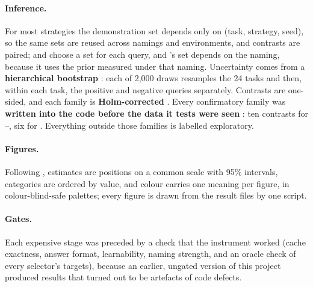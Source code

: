 \paragraph{Inference.}
For most strategies the demonstration set depends only on (task, strategy, seed), so the same sets are reused across namings and environments, and contrasts are paired;  and \sata choose a set for each query, and 's set depends on the naming, because it uses the prior measured under that naming.
Uncertainty comes from a \textbf{hierarchical bootstrap} \citep{efron1993introduction,davison1997bootstrap}: each of 2,000 draws resamples the 24 tasks and then, within each task, the positive and negative queries separately.
Contrasts are one-sided, and each family is \textbf{Holm-corrected} \citep{holm1979simple}.
Every confirmatory family was \textbf{written into the code before the data it tests were seen} \citep{nosek2018preregistration}: ten contrasts for --, six for \sata.
Everything outside those families is labelled exploratory.

\paragraph{Figures.}
Following \citet{healy2019data}, estimates are positions on a common scale with 95\% intervals, categories are ordered by value, and colour carries one meaning per figure, in colour-blind-safe palettes; every figure is drawn from the result files by one script.

\paragraph{Gates.}
Each expensive stage was preceded by a check that the instrument worked (cache exactness, answer format, learnability, naming strength, and an oracle check of every selector's targets), because an earlier, ungated version of this project produced results that turned out to be artefacts of code defects.
